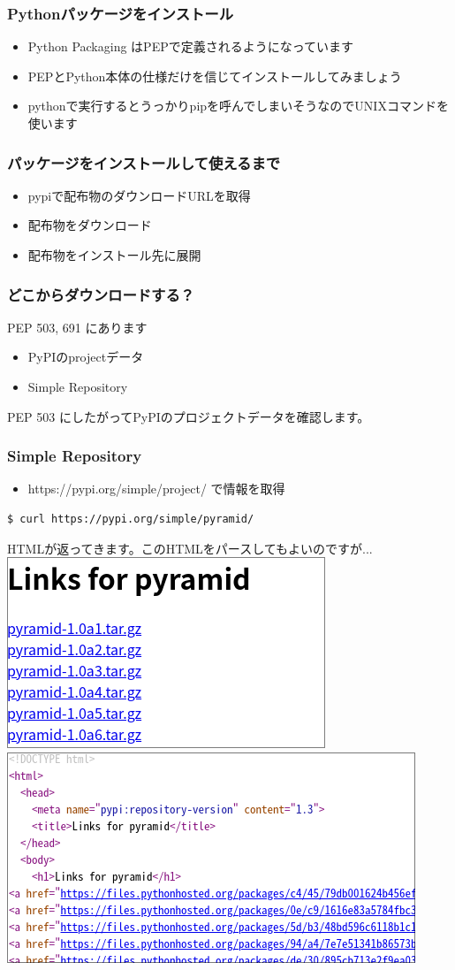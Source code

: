 \documentclass[aspectratio=169]{beamer}
\begin{document}
\begin{frame}
\frametitle{Pythonパッケージをインストール}
\begin{itemize}
\item Python Packaging はPEPで定義されるようになっています
\item PEPとPython本体の仕様だけを信じてインストールしてみましょう
\item pythonで実行するとうっかりpipを呼んでしまいそうなのでUNIXコマンドを使います
\end{itemize}
\end{frame}


\begin{frame}
\frametitle{パッケージをインストールして使えるまで}
\begin{itemize}
\item pypiで配布物のダウンロードURLを取得
\item 配布物をダウンロード
\item 配布物をインストール先に展開
\end{itemize}
\end{frame}

\begin{frame}
\frametitle{どこからダウンロードする？}
PEP 503, 691 にあります
\begin{itemize}
\item PyPIのprojectデータ
\item Simple Repository
\end{itemize}
\end{frame}

\begin{frame}[fragile]
PEP 503 にしたがってPyPIのプロジェクトデータを確認します。
\frametitle{Simple Repository}
\begin{itemize}
\item https://pypi.org/simple/{project}/ で情報を取得
\end{itemize}
\begin{lstlisting}
$ curl https://pypi.org/simple/pyramid/
\end{lstlisting}
HTMLが返ってきます。このHTMLをパースしてもよいのですが...
\includegraphics[width=0.3\linewidth]{pypi-pyramid.png}
\includegraphics[width=0.3\linewidth]{pypi-pyramid-source.png}
\end{frame}
\end{document}
